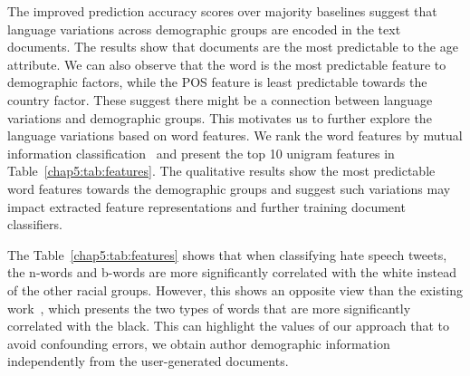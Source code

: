 The improved prediction accuracy scores over majority baselines suggest that language variations across demographic groups are encoded in the text documents. 
The results show that documents are the most predictable to the age attribute.
We can also observe that the word is the most predictable feature to demographic factors,
while the POS feature is least predictable towards the country factor.
These suggest there might be a connection between language variations and demographic groups.
This motivates us to further explore the language variations based on word features.
We rank the word features by mutual information classification~\cite{pedregosa2011scikit} and present the top 10 unigram features in Table~\ref{chap5:tab:features}.
The qualitative results show the most predictable word features towards the demographic groups and 
suggest such variations may impact extracted feature representations and further training document classifiers.


\begin{table}[tb!]
\centering
{}
\caption{Top 10 predictable features of race and gender.}
\label{chap5:tab:features}
\end{table}

The Table~\ref{chap5:tab:features} shows that when classifying hate speech tweets, the n-words and b-words are more significantly correlated with the white instead of the other racial groups.
However, this shows an opposite view than the existing work~\cite{davidson2019racial}, which presents the two types of words that are more significantly correlated with the black.
This can highlight the values of our approach that to avoid confounding errors, we obtain author demographic information independently from the user-generated documents.


